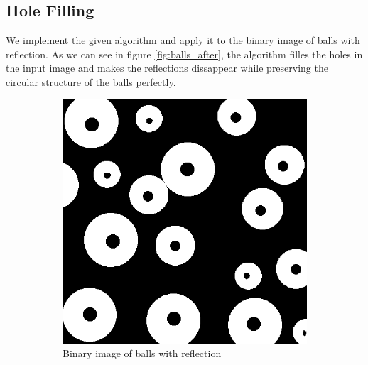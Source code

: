 \documentclass[]{article}
\begin{document}
\subsection{Hole Filling}
We implement the given algorithm and apply it to the binary image of balls with reflection. As we can see in figure \ref{fig:balls_after}, the algorithm filles the holes in the input image and makes the reflections dissappear while preserving the circular structure of the balls perfectly.
\begin{figure}[H]
    \centering
    \begin{subfigure}{0.5\textwidth}
        \centering
        \includegraphics[width=\textwidth]{img/before/balls-with-reflections}
        \caption{Binary image of balls with reflection}
        \label{fig:balls_before}
    \end{subfigure}%
    ~
    \begin{subfigure}{0.5\textwidth}
        \centering

\end{subfigure}
\end{figure}
\end{document}
